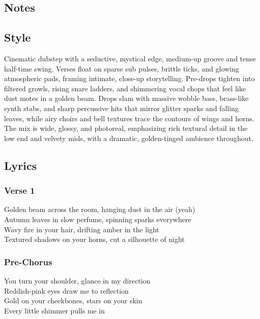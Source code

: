 \subsection{Notes}\label{notes-13}

\subsection{Style}\label{style-12}

Cinematic dubstep with a seductive, mystical edge, medium-up groove and
tense half-time swing. Verses float on sparse sub pulses, brittle ticks,
and glowing atmospheric pads, framing intimate, close-up storytelling.
Pre-drops tighten into filtered growls, rising snare ladders, and
shimmering vocal chops that feel like dust motes in a golden beam. Drops
slam with massive wobble bass, brass-like synth stabs, and sharp
percussive hits that mirror glitter sparks and falling leaves, while
airy choirs and bell textures trace the contours of wings and horns. The
mix is wide, glossy, and photoreal, emphasizing rich textural detail in
the low end and velvety mids, with a dramatic, golden-tinged ambience
throughout.

\subsection{Lyrics}\label{lyrics-12}

\subsubsection{Verse 1}\label{verse-1-5}

Golden beam across the room, hanging dust in the air (yeah)\\
Autumn leaves in slow perfume, spinning sparks everywhere\\
Wavy fire in your hair, drifting amber in the light\\
Textured shadows on your horns, cut a silhouette of night

\subsubsection{Pre-Chorus}\label{pre-chorus-4}

You turn your shoulder, glance in my direction\\
Reddish-pink eyes draw me to reflection\\
Gold on your cheekbones, stars on your skin\\
Every little shimmer pulls me in

